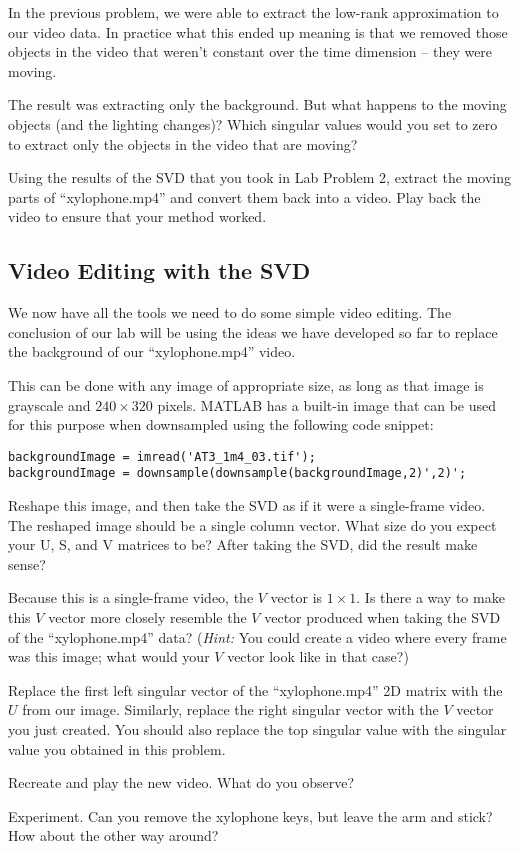 In the previous problem, we were able to extract the low-rank approximation to our video data. In practice what this ended up meaning is that we removed those objects in the video that weren't constant over the time dimension -- they were moving.

The result was extracting only the background. But what happens to the moving objects (and the lighting changes)? Which singular values would you set to zero to extract only the objects in the video that are moving?

Using the results of the SVD that you took in Lab Problem 2, extract the moving parts of ``xylophone.mp4'' and convert them back into a video. Play back the video to ensure that your method worked.

\subsection{Video Editing with the SVD}

We now have all the tools we need to do some simple video editing. The conclusion of our lab will be using the ideas we have developed so far to replace the background of our ``xylophone.mp4'' video.

This can be done with any image of appropriate size, as long as that image is grayscale and $240 \times 320$ pixels. MATLAB has a built-in image that can be used for this purpose when downsampled using the following code snippet:

\begin{lstlisting}[style=code]
backgroundImage = imread('AT3_1m4_03.tif');
backgroundImage = downsample(downsample(backgroundImage,2)',2)';
\end{lstlisting}

Reshape this image, and then take the SVD as if it were a single-frame video. The reshaped image should be a single column vector. What size do you expect your U, S, and V matrices to be? After taking the SVD, did the result make sense?

Because this is a single-frame video, the $V$ vector is $1\times 1$. Is there a way to make this $V$ vector more closely resemble the $V$ vector produced when taking the SVD of the ``xylophone.mp4'' data?
(\textit{Hint:}  You could create a video where every frame was this image; what would your $V$ vector look like in that case?)

Replace the first left singular vector of the ``xylophone.mp4'' 2D matrix with the $U$ from our image. Similarly, replace the right singular vector with the $V$ vector you just created. You should also replace the top singular value with the singular value you obtained in this problem.

Recreate and play the new video. What do you observe?

Experiment. Can you remove the xylophone keys, but leave the arm and stick? How about the other way around?



